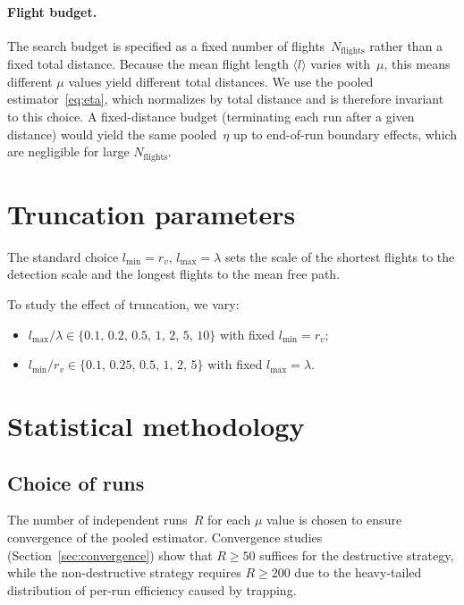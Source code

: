 \paragraph{Flight budget.}
The search budget is specified as a fixed number of
flights~$N_{\mathrm{flights}}$ rather than a fixed total
distance.  Because the mean flight length $\langle l \rangle$
varies with~$\mu$, this means different $\mu$ values yield
different total distances.  We use the pooled
estimator~\eqref{eq:eta}, which normalizes by total distance
and is therefore invariant to this choice.  A fixed-distance
budget (terminating each run after a given distance) would
yield the same pooled~$\eta$ up to end-of-run boundary effects,
which are negligible for large $N_{\mathrm{flights}}$.

\section{Truncation parameters}
\label{sec:truncation}

The standard choice $l_{\min} = r_v$, $l_{\max} = \lambda$
sets the scale of the shortest flights to the detection scale
and the longest flights to the mean free path.

To study the effect of truncation, we vary:
\begin{itemize}
  \item $l_{\max}/\lambda \in \{0.1,\,0.2,\,0.5,\,1,\,2,\,5,\,10\}$
        with fixed $l_{\min} = r_v$;
  \item $l_{\min}/r_v \in \{0.1,\,0.25,\,0.5,\,1,\,2,\,5\}$
        with fixed $l_{\max} = \lambda$.
\end{itemize}

\section{Statistical methodology}
\label{sec:stat_method}

\subsection{Choice of runs}

The number of independent runs~$R$ for each $\mu$ value
is chosen to ensure convergence of the pooled estimator.
Convergence studies (Section~\ref{sec:convergence}) show that
$R \geq 50$ suffices for the destructive strategy, while
the non-destructive strategy requires $R \geq 200$ due to
the heavy-tailed distribution of per-run efficiency caused by
trapping.

